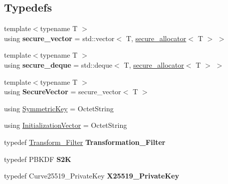 \subsection*{Typedefs}
\begin{DoxyCompactItemize}
\item 
\mbox{\label{namespace_botan_ae90f7fcf7b0aa3dd88a59f186f6e6307}} 
{\footnotesize template$<$typename T $>$ }\\using {\bfseries secure\+\_\+vector} = std\+::vector$<$ T, \mbox{\hyperlink{class_botan_1_1secure__allocator}{secure\+\_\+allocator}}$<$ T $>$ $>$
\item 
\mbox{\label{namespace_botan_a15c6c2c9f6366dcefa326d40c7d0f281}} 
{\footnotesize template$<$typename T $>$ }\\using {\bfseries secure\+\_\+deque} = std\+::deque$<$ T, \mbox{\hyperlink{class_botan_1_1secure__allocator}{secure\+\_\+allocator}}$<$ T $>$ $>$
\item 
\mbox{\label{namespace_botan_aee2f8a23186bf117dde5a6bf7f59fad9}} 
{\footnotesize template$<$typename T $>$ }\\using {\bfseries Secure\+Vector} = secure\+\_\+vector$<$ T $>$
\item 
using \mbox{\hyperlink{namespace_botan_a89cf6c3513428f524454d01830221a88}{Symmetric\+Key}} = Octet\+String
\item 
using \mbox{\hyperlink{namespace_botan_a2fbf5195ffe701adcabb1f8c41bfc557}{Initialization\+Vector}} = Octet\+String
\item 
\mbox{\label{namespace_botan_a49f398856b09d29fedf055b9bb730357}} 
typedef \mbox{\hyperlink{namespace_botan_a021ffc520728602cd2f027a40b68bc5f}{Transform\+\_\+\+Filter}} {\bfseries Transformation\+\_\+\+Filter}
\item 
\mbox{\label{namespace_botan_a5205c90055f402fac271c40e30dd64ba}} 
typedef P\+B\+K\+DF {\bfseries S2K}
\item 
\mbox{\label{namespace_botan_a2c7f1f0b1e64d17eb434bd3f8e74d25b}} 
typedef Curve25519\+\_\+\+Private\+Key {\bfseries X25519\+\_\+\+Private\+Key}
\item 
\mbox{\label{namespace_botan_a5a6ad46a3e0235b7d8fa64faa2a9f17a}} 

\end{DoxyCompactItemize}
